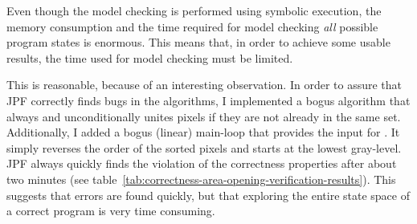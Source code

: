 Even though the model checking is performed using symbolic execution, the memory
consumption and the time required for model checking \emph{all} possible program
states is enormous. This means that, in order to achieve some usable results,
the time used for model checking must be limited.

\begin{table}
  \centering
  \caption{Algorithms and their corresponding acronyms.}
  \label{tab:algorithms-acronyms}
\end{table}

This is reasonable, because of an interesting observation. In order to assure
that JPF correctly finds bugs in the algorithms, I implemented a bogus
 algorithm that always and unconditionally unites pixels if
they are not already in the same set. Additionally, I added a bogus (linear)
main-loop that provides the input for . It simply
reverses the order of the sorted pixels and starts at the lowest gray-level. JPF
always quickly finds the violation of the correctness properties after about two
minutes (see
table~\ref{tab:correctness-area-opening-verification-results}). This suggests
that errors are found quickly, but that exploring the entire state space of a
correct program is very time consuming.


